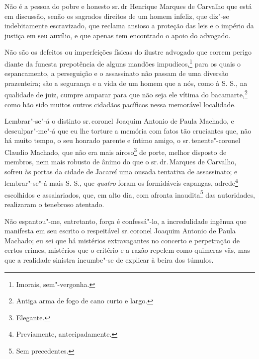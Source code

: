 Não é a pessoa do pobre e honesto sr.\,dr Henrique Marques de Carvalho
que está em discussão, senão os sagrados direitos de um homem infeliz,
que diz"-se indebitamente escravizado, que reclama ansioso a proteção das
leis e o império da justiça em seu auxílio, e que apenas tem encontrado
o apoio do advogado.

Não são os defeitos ou imperfeições físicas do ilustre advogado que
correm perigo diante da funesta prepotência de alguns mandões
impudicos,\footnote{Imorais, sem"-vergonha.} para os quais o
espancamento, a perseguição e o assassinato não passam de uma diversão
prazenteira; são a segurança e a vida de um homem que a nós, como à S.
S., na qualidade de juiz, cumpre amparar para que não seja ele vítima do
bacamarte,\footnote{Antiga arma de fogo de cano curto e largo.} como
hão sido muitos outros cidadãos pacíficos nessa memorável localidade.

Lembrar"-se"-á o distinto sr.\,coronel Joaquim Antonio de Paula Machado, e
desculpar"-me"-á que eu lhe torture a memória com fatos tão cruciantes
que, não há muito tempo, o seu honrado parente e íntimo amigo, o sr.\,tenente"-coronel Claudio Machado, que não era mais airoso\footnote{
  Elegante.} de porte, melhor disposto de membros, nem mais robusto de
ânimo do que o sr.\,dr.\,Marques de Carvalho, sofreu às portas da cidade
de Jacareí uma ousada tentativa de assassinato; e lembrar"-se"-á mais S.
S., que \emph{quatro} foram os formidáveis capangas, adrede\footnote{
  Previamente, antecipadamente.} escolhidos e assalariados, que, em alto
dia, com afronta inaudita\footnote{Sem precedentes.} das autoridades,
realizaram o tenebroso atentado.


Não espantou"-me, entretanto, força é confessá"-lo, a incredulidade
ingênua que manifesta em seu escrito o respeitável sr.\,coronel Joaquim
Antonio de Paula Machado; eu sei que há mistérios extravagantes no
concerto e perpetração de certos crimes, mistérios que o critério e a
razão repelem como quimeras vãs, mas que a realidade sinistra incumbe"-se
de explicar à beira dos túmulos.

